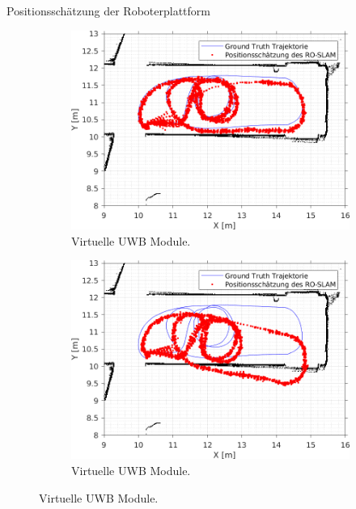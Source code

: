\documentclass{beamer}
\begin{document}
\begin{frame}{Positionsschätzung der Roboterplattform}
\begin{figure}
		\par
		\bigskip
		\begin{subfigure}{0.4\linewidth}
			\centering
			\includegraphics[width=\linewidth]{Record_2018-02-08-12-33-53_filtered_5_trajectory_pf}
			\caption{Virtuelle UWB Module.}
		\end{subfigure}
		\hfill
		\begin{subfigure}{0.4\linewidth}
			\centering
			\includegraphics[width=\linewidth]{Record_2018-02-08-12-33-53_filtered_4_trajectory_pf}
			\caption{Virtuelle UWB Module.}
		\end{subfigure}
	\end{figure}
	
\end{frame}
\end{document}
